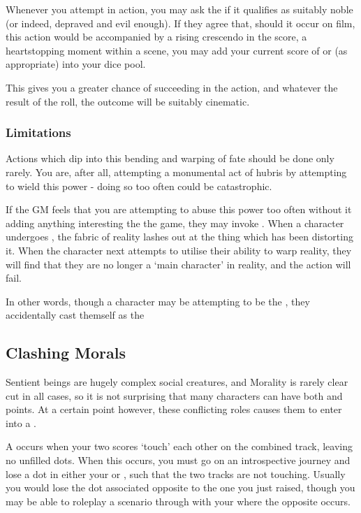 Whenever you attempt in action, you may ask the  if it qualifies as suitably noble (or indeed, depraved and evil enough). If they agree that, should it occur on film, this action would be accompanied by a rising crescendo in the score, a heartstopping moment within a scene, you may add your current score of  or  (as appropriate) into your dice pool. 

This gives you a greater chance of succeeding in the action, and whatever the result of the roll, the outcome will be suitably cinematic. 

\subsubsection{Limitations}

Actions which dip into this bending and warping of fate should be done only rarely. You are, after all, attempting a monumental act of hubris by attempting to wield this power - doing so too often could be catastrophic. 

If the GM feels that you are attempting to abuse this power too often without it adding anything interesting the the game, they may invoke . When a character undergoes , the fabric of reality lashes out at the thing which has been distorting it. When the character next attempts to utilise their ability to warp reality, they will find that they are no longer a `main character' in reality, and the action will fail. 

In other words, though a character may be attempting to be the , they accidentally cast themself as the  

\subsection{Clashing Morals}

Sentient beings are hugely complex social creatures, and Morality is rarely clear cut in all cases, so it is not surprising that many characters can have both  and  points. At a certain point however, these conflicting roles causes them to enter into a . 

A  occurs when your two scores `touch' each other on the combined track, leaving no unfilled dots. When this occurs, you must go on an introspective journey and lose a dot in either your  or , such that the two tracks are not touching. Usually you would lose the dot associated opposite to the one you just raised, though you may be able to roleplay a scenario through with your  where the opposite occurs. 

